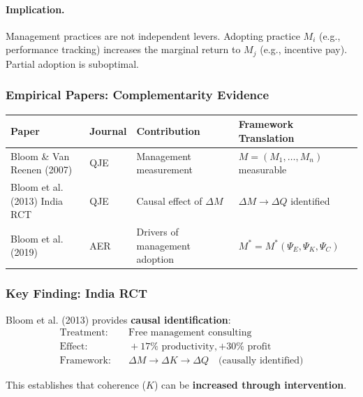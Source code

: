 \paragraph{Implication.}
Management practices are not independent levers. Adopting practice $M_i$ 
(e.g., performance tracking) increases the marginal return to $M_j$ 
(e.g., incentive pay). Partial adoption is suboptimal.

\subsubsection{Empirical Papers: Complementarity Evidence}

\begin{center}
\small
\renewcommand{\arraystretch}{1.3}
\begin{tabular}{|p{3.5cm}|p{2cm}|p{4cm}|p{4cm}|}
\hline
\textbf{Paper} & \textbf{Journal} & \textbf{Contribution} & \textbf{Framework Translation} \\
\hline
Bloom \& Van Reenen (2007) & QJE & Management measurement & $M = (M_1, \ldots, M_n)$ measurable \\
\hline
Bloom et al. (2013) India RCT & QJE & Causal effect of $\Delta M$ & $\Delta M \to \Delta Q$ identified \\
\hline
Bloom et al. (2019) & AER & Drivers of management adoption & $M^* = M^*(\Psi_E, \Psi_K, \Psi_C)$ \\
\hline
\end{tabular}
\end{center}

\subsubsection{Key Finding: India RCT}

Bloom et al. (2013) provides \textbf{causal identification}:
\begin{align}
\text{Treatment:} & \quad \text{Free management consulting} \nonumber \\
\text{Effect:} & \quad +17\% \text{ productivity}, +30\% \text{ profit} \nonumber \\
\text{Framework:} & \quad \Delta M \to \Delta K \to \Delta Q \quad \text{(causally identified)}
\end{align}

This establishes that coherence ($K$) can be \textbf{increased through intervention}.

